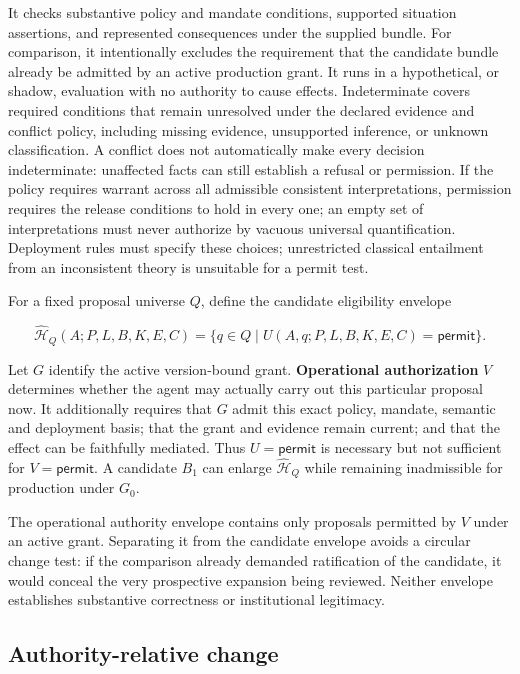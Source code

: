 \documentclass[
  english,
  12pt,
  a4paper,
  preprint,
  numbers,
  nopreprintline]{elsarticle}
\begin{document}
It checks substantive policy and mandate conditions, supported situation
assertions, and represented consequences under the supplied bundle. For
comparison, it intentionally excludes the requirement that the candidate
bundle already be admitted by an active production grant. It runs in a
hypothetical, or shadow, evaluation with no authority to cause effects.
Indeterminate covers required conditions that remain unresolved under
the declared evidence and conflict policy, including missing evidence,
unsupported inference, or unknown classification. A conflict does not
automatically make every decision indeterminate: unaffected facts can
still establish a refusal or permission. If the policy requires warrant
across all admissible consistent interpretations, permission requires
the release conditions to hold in every one; an empty set of
interpretations must never authorize by vacuous universal
quantification. Deployment rules must specify these choices;
unrestricted classical entailment from an inconsistent theory is
unsuitable for a permit test.

For a fixed proposal universe \(Q\), define the candidate eligibility
envelope

\[ \widehat{\mathcal{H}}_{Q}(A;P,L,B,K,E,C)
= \{q\in Q \mid U(A,q;P,L,B,K,E,C)=\mathsf{permit}\}. \]

Let \(G\) identify the active version-bound grant. \textbf{Operational
authorization} \(V\) determines whether the agent may actually carry out
this particular proposal now. It additionally requires that \(G\) admit
this exact policy, mandate, semantic and deployment basis; that the
grant and evidence remain current; and that the effect can be faithfully
mediated. Thus \(U=\mathsf{permit}\) is necessary but not sufficient for
\(V=\mathsf{permit}\). A candidate \(B_1\) can enlarge
\(\widehat{\mathcal{H}}_Q\) while remaining inadmissible for production
under \(G_0\).

The operational authority envelope contains only proposals permitted by
\(V\) under an active grant. Separating it from the candidate envelope
avoids a circular change test: if the comparison already demanded
ratification of the candidate, it would conceal the very prospective
expansion being reviewed. Neither envelope establishes substantive
correctness or institutional legitimacy.

\subsection{Authority-relative change}\label{authority-relative-change}
\end{document}
